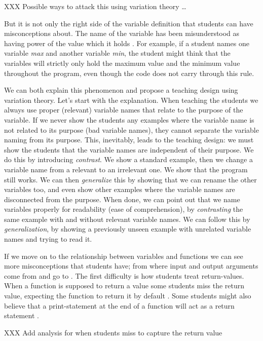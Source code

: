 XXX Possible ways to attack this using variation theory \dots

But it is not only the right side of the variable definition that students can 
have misconceptions about. The name of the variable has been misunderstood as 
having power of the value which it holds 
\parencite{MisconceptionsSurvey2017,Sleeman1984}. For example, if a student 
names one variable \emph{max} and another variable \emph{min}, the student 
might think that the variables will strictly only hold the maximum value and 
the minimum value throughout the program, even though the code does not carry through this rule. 

We can both explain this phenomenon and propose a teaching design using 
variation theory.
Let's start with the explanation.
When teaching the students we always use proper (\ie relevant) variable names 
that relate to the purpose of the variable.
If we never show the students any examples where the variable name is not 
related to its purpose (bad variable names), they cannot separate the variable 
naming from its purpose.
This, inevitably, leads to the teaching design:
we must show the students that the variable names are independent of their 
purpose.
We do this by introducing \emph{contrast}.
We show a standard example, then we change a variable name from a relevant to 
an irrelevant one.
We show that the program still works.
We can then \emph{generalize} this by showing that we can rename the other 
variables too, and even show other examples where the variable names are 
disconnected from the purpose.
When done, we can point out that we name variables properly for readability 
(ease of comprehension), by \emph{contrasting} the same example with and 
without relevant variable names.
We can follow this by \emph{generalization}, by showing a previously unseen 
example with unrelated variable names and trying to read it.

If we move on to the relationship between variables and functions we can see 
more misconceptions that students have; from where input and output arguments 
come from and go to \parencite{Ragonis2005OOP}.
The first difficulty is how students treat return-values. When a function is 
supposed to return a value some students miss the return value, expecting the 
function to return it by default \parencite{Kurvinen2016,KumarVeerasamy2016}. Some students might also believe that a print-statement at the end of a 
function will act as a return statement \parencite{MisconceptionsSurvey2017}. 

XXX Add analysis for when students miss to capture the return value


